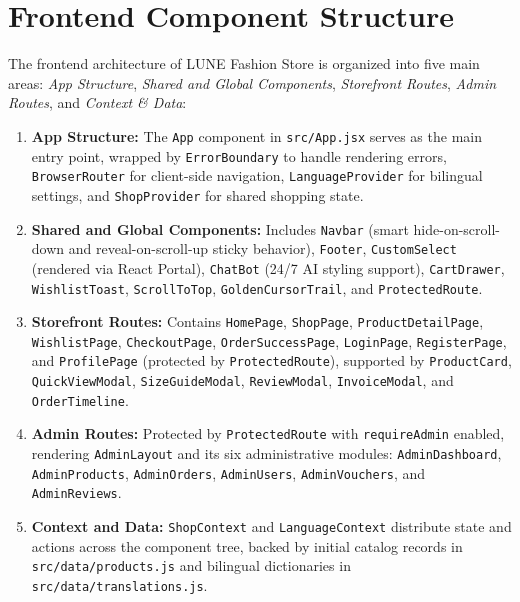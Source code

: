 \documentclass[12pt,a4paper,oneside]{report}
\begin{document}
\section{Frontend Component Structure}
The frontend architecture of LUNE Fashion Store is organized into five main areas: \textit{App Structure}, \textit{Shared and Global Components}, \textit{Storefront Routes}, \textit{Admin Routes}, and \textit{Context \& Data}:
\begin{enumerate}[leftmargin=1.2cm]
    \item \textbf{App Structure:} The \texttt{App} component in \texttt{src/App.jsx} serves as the main entry point, wrapped by \texttt{ErrorBoundary} to handle rendering errors, \texttt{BrowserRouter} for client-side navigation, \texttt{LanguageProvider} for bilingual settings, and \texttt{ShopProvider} for shared shopping state.
    \item \textbf{Shared and Global Components:} Includes \texttt{Navbar} (smart hide-on-scroll-down and reveal-on-scroll-up sticky behavior), \texttt{Footer}, \texttt{CustomSelect} (rendered via React Portal), \texttt{ChatBot} (24/7 AI styling support), \texttt{CartDrawer}, \texttt{WishlistToast}, \texttt{ScrollToTop}, \texttt{GoldenCursorTrail}, and \texttt{ProtectedRoute}.
    \item \textbf{Storefront Routes:} Contains \texttt{HomePage}, \texttt{ShopPage}, \texttt{ProductDetailPage}, \texttt{WishlistPage}, \texttt{CheckoutPage}, \texttt{OrderSuccessPage}, \texttt{LoginPage}, \texttt{RegisterPage}, and \texttt{ProfilePage} (protected by \texttt{ProtectedRoute}), supported by \texttt{ProductCard}, \texttt{QuickViewModal}, \texttt{SizeGuideModal}, \texttt{ReviewModal}, \texttt{InvoiceModal}, and \texttt{OrderTimeline}.
    \item \textbf{Admin Routes:} Protected by \texttt{ProtectedRoute} with \texttt{requireAdmin} enabled, rendering \texttt{AdminLayout} and its six administrative modules: \texttt{AdminDashboard}, \texttt{AdminProducts}, \texttt{AdminOrders}, \texttt{AdminUsers}, \texttt{AdminVouchers}, and \texttt{AdminReviews}.
    \item \textbf{Context and Data:} \texttt{ShopContext} and \texttt{LanguageContext} distribute state and actions across the component tree, backed by initial catalog records in \texttt{src/data/products.js} and bilingual dictionaries in \texttt{src/data/translations.js}.
\end{enumerate}

\end{document}
